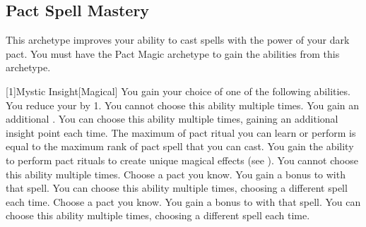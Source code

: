 



    \subsection{Pact Spell Mastery}
        This archetype improves your ability to cast spells with the power of your dark pact.
        You must have the Pact Magic archetype to gain the abilities from this archetype.

        [1]{Mystic Insight}[Magical] You gain your choice of one of the following abilities.
        {
             You reduce your  by 1.
                You cannot choose this ability multiple times.
             You gain an additional .
                You can choose this ability multiple times, gaining an additional insight point each time.
             The maximum  of pact ritual you can learn or perform is equal to the maximum rank of pact spell that you can cast.
                You gain the ability to perform pact rituals to create unique magical effects (see ).
                You cannot choose this ability multiple times.
             Choose a pact  you know.
                You gain a  bonus to  with that spell.
                You can choose this ability multiple times, choosing a different spell each time.
             Choose a pact  you know.
                You gain a  bonus to  with that spell.
                You can choose this ability multiple times, choosing a different spell each time.
        }

